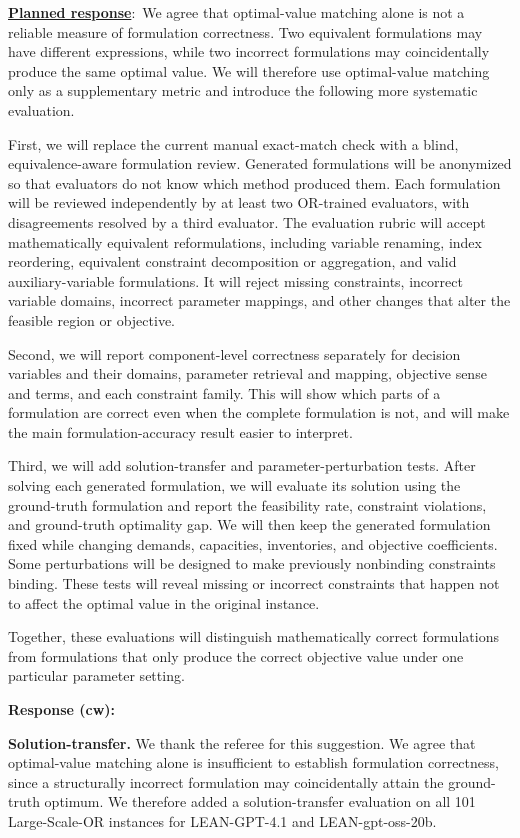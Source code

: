 \documentclass[11pt]{article}
\newcommand{\planned}{\noindent\underline{\textbf{Planned response}}:\ }
\begin{document}
\begin{enumerate}[label=(R1.Major.\arabic*),leftmargin=*]
\planned We agree that optimal-value matching alone is not a reliable measure
of formulation correctness. Two equivalent formulations may have different
expressions, while two incorrect formulations may coincidentally produce the
same optimal value. We will therefore use optimal-value matching only as a
supplementary metric and introduce the following more systematic evaluation.

First, we will replace the current manual exact-match check with a blind,
equivalence-aware formulation review. Generated formulations will be
anonymized so that evaluators do not know which method produced them. Each
formulation will be reviewed independently by at least two OR-trained
evaluators, with disagreements resolved by a third evaluator. The evaluation
rubric will accept mathematically equivalent reformulations, including
variable renaming, index reordering, equivalent constraint decomposition or
aggregation, and valid auxiliary-variable formulations. It will reject
missing constraints, incorrect variable domains, incorrect parameter
mappings, and other changes that alter the feasible region or objective.

Second, we will report component-level correctness separately for decision
variables and their domains, parameter retrieval and mapping, objective sense
and terms, and each constraint family. This will show which parts of a
formulation are correct even when the complete formulation is not, and will
make the main formulation-accuracy result easier to interpret.

Third, we will add solution-transfer and parameter-perturbation tests. After
solving each generated formulation, we will evaluate its solution using the
ground-truth formulation and report the feasibility rate, constraint
violations, and ground-truth optimality gap. We will then keep the generated
formulation fixed while changing demands, capacities, inventories, and
objective coefficients. Some perturbations will be designed to make
previously nonbinding constraints binding. These tests will reveal missing or
incorrect constraints that happen not to affect the optimal value in the
original instance.

Together, these evaluations will distinguish mathematically correct
formulations from formulations that only produce the correct objective value
under one particular parameter setting.

\textbf{Response (cw):}

\noindent\textbf{Solution-transfer.}
We thank the referee for this suggestion. We agree that optimal-value matching alone is insufficient to establish formulation correctness, since a structurally incorrect formulation may coincidentally attain the ground-truth optimum. We therefore added a solution-transfer evaluation on all 101 Large-Scale-OR instances for LEAN-GPT-4.1 and LEAN-gpt-oss-20b.


\end{enumerate}
\end{document}
